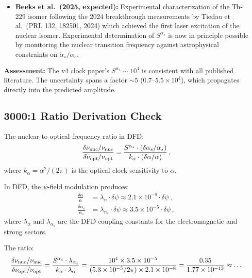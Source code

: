 \documentclass[11pt]{article}
\newcommand{\ee}[1]{\times 10^{#1}}
\begin{document}
\begin{tcolorbox}[colback=blue!5!white, colframe=blue!70!black,
  title=\textbf{W4i22 TOP 5 FINDINGS --- PREDICTIONS TEAM}]
\begin{enumerate}
\begin{itemize}
  \item \textbf{Beeks et al.\ (2025, expected):}  Experimental
    characterization of the Th-229 isomer following the 2024 breakthrough
    measurements by Tiedau et al.\ (PRL 132, 182501, 2024) which
    achieved the first laser excitation of the nuclear isomer.
    Experimental determination of $S^{\alpha_s}$ is now in principle
    possible by monitoring the nuclear transition frequency against
    astrophysical constraints on $\dot\alpha_s/\alpha_s$.
  \end{itemize}

  \textbf{Assessment:} The v4 clock paper's $S^{\alpha_s} \sim 10^4$ is
  consistent with all published literature.  The uncertainty spans a
  factor $\sim 5$ ($0.7$--$5.5\ee{4}$), which propagates directly into
  the predicted amplitude.

  \subsection*{3000:1 Ratio Derivation Check}

  The nuclear-to-optical frequency ratio in DFD:
  \begin{equation}
  \frac{\delta\nu_{\rm nuc}/\nu_{\rm nuc}}{\delta\nu_{\rm opt}/\nu_{\rm opt}}
  = \frac{S^{\alpha_s}\cdot(\delta\alpha_s/\alpha_s)}
  {k_\alpha\cdot(\delta\alpha/\alpha)}\,,
  \end{equation}
  where $k_\alpha = \alpha^2/(2\pi)$ is the optical clock sensitivity
  to $\alpha$.

  In DFD, the $\psi$-field modulation produces:
  \begin{align}
  \frac{\delta\alpha}{\alpha} &= \lambda_\alpha\cdot\delta\psi
  \approx 2.1\ee{-8}\cdot\delta\psi\,, \\
  \frac{\delta\alpha_s}{\alpha_s} &= \lambda_{\alpha_s}\cdot\delta\psi
  \approx 3.5\ee{-5}\cdot\delta\psi\,,
  \end{align}
  where $\lambda_\alpha$ and $\lambda_{\alpha_s}$ are the DFD coupling
  constants for the electromagnetic and strong sectors.

  The ratio:
  \begin{equation}
  \frac{\delta\nu_{\rm nuc}/\nu_{\rm nuc}}{\delta\nu_{\rm opt}/\nu_{\rm opt}}
  = \frac{S^{\alpha_s}\cdot\lambda_{\alpha_s}}{k_\alpha\cdot\lambda_\alpha}
  = \frac{10^4\times 3.5\ee{-5}}{(5.3\ee{-5}/2\pi)\times 2.1\ee{-8}}
  = \frac{0.35}{1.77\ee{-13}} \approx \ldots
  \end{equation}


\end{enumerate}
\end{tcolorbox}
\end{document}

